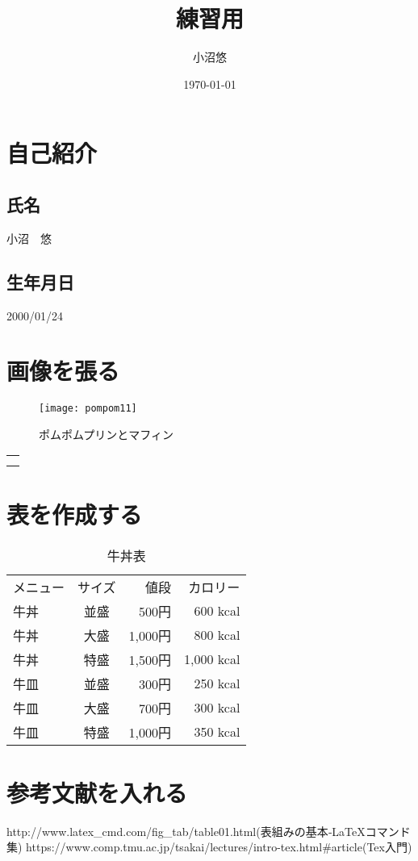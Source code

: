 \documentclass{jarticle}
\title{練習用}
\author{小沼悠}
\date{\today}
\begin{document}
  \maketitle

\section{自己紹介}
\subsection{氏名}
小沼　悠
\subsection{生年月日}
2000/01/24
\section{画像を張る}
\begin{figure}[htbp]
\begin{center}
\texttt{[image: pompom11]}
\caption{ポムポムプリンとマフィン}
\end{center}
\end{figure}
\begin{tabular}{l}
\\
\\
\\
\end{tabular}
\section {表を作成する}
\begin{table}[h]
\begin{flushleft}
  \begin{tabular}{|l|c|r|r|}
    メニュー & サイズ & 値段 & カロリー \\
    牛丼 & 並盛 & 500円 & 600 kcal \\
    牛丼 & 大盛 & 1,000円 & 800 kcal \\
    牛丼 & 特盛 & 1,500円 & 1,000 kcal \\
    牛皿 & 並盛 & 300円 & 250 kcal \\
    牛皿 & 大盛 & 700円 & 300 kcal \\
    牛皿 & 特盛 & 1,000円 & 350 kcal\\
  \end{tabular}
\caption{牛丼表}
\end{flushleft}
\end{table}

\section {参考文献を入れる}
\begin{thebibliography}{9}
http://www.latex\_cmd.com/fig\_tab/table01.html(表組みの基本‐LaTeXコマンド集)
https://www.comp.tmu.ac.jp/tsakai/lectures/intro-tex.html\#article(Tex入門)
\end{thebibliography}
\end{document}
